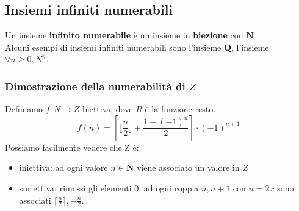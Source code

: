 \documentclass{report}
\begin{document}
    \subsection{Insiemi infiniti numerabili}
        Un insieme \textbf{infinito numerabile} è un insieme in \textbf{biezione} con $\mathbf{N}$ \\
        Alcuni esempi di insiemi infiniti numerabili sono l'insieme $\mathbf{Q}$, l'insieme $\forall n \geq 0, N^n$.
        \subsubsection{Dimostrazione della numerabilità di $Z$}
            Definiamo $f: N \longrightarrow Z$ biettiva, dove $R$ è la funzione resto.
            $$f\left(n\right) = \left[\lfloor \frac{n}{2} \rfloor + \frac{1 - \left(-1\right)^n}{2}\right]  \cdot \left(-1\right)^{n+1}$$
            Possiamo facilmente vedere che Z è:
            \begin{itemize}
                \item iniettiva: ad ogni valore $n \in \mathbf{N}$ viene associato un valore in $Z$
                \item suriettiva: rimossi gli elementi $0$, ad ogni coppia $n, n+1$ con $n = 2x$ sono associati
                    $\lceil \frac{n}{2} \rceil ,-\frac{n}{2}$.
            \end{itemize}
\end{document}
